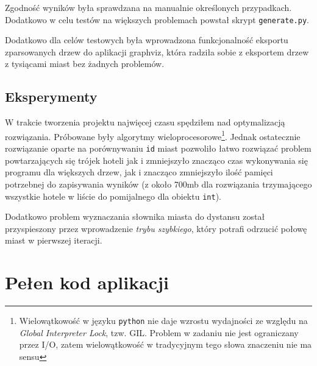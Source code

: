 \documentclass[12pt,a4paper]{article}
\begin{document}
    Zgodność wyników była sprawdzana na manualnie określonych przypadkach.
    Dodatkowo w celu testów na większych problemach powstał skrypt
    \texttt{generate.py}.

    Dodatkowo dla celów testowych była wprowadzona funkcjonalność eksportu
    zparsowanych drzew do aplikacji graphviz, która radziła sobie z eksportem
    drzew z tysiącami miast bez żadnych problemów.
	
	\subsection*{Eksperymenty}

    W trakcie tworzenia projektu najwięcej czasu spędziłem nad optymalizacją
    rozwiązania. Próbowane były algorytmy wieloprocesorowe\footnote{Wielowątkowość
    w języku \texttt{python} nie daje wzrostu wydajności ze względu na
    \emph{Global Interpreter Lock}, tzw. GIL. Problem w zadaniu nie jest
    ograniczany przez I/O, zatem wielowątkowość w tradycyjnym tego słowa
    znaczeniu nie ma sensu}. Jednak ostatecznie rozwiązanie
    oparte na porównywaniu \texttt{id} miast pozwoliło łatwo rozwiązać problem
    powtarzających się trójek hoteli jak i zmniejszyło znacząco czas
    wykonywania się programu dla większych drzew, jak i znacząco zmniejszyło
    ilość pamięci potrzebnej do zapisywania wyników (z około 700mb dla
    rozwiązania trzymającego wszystkie hotele w liście do pomijalnego dla
    obiektu \texttt{int}). 

    Dodatkowo problem wyznaczania słownika miasta do dystansu został
    przyspieszony przez wprowadzenie \emph{trybu szybkiego}, który potrafi
    odrzucić połowę miast w pierwszej iteracji.


    \newpage
	\section*{Pełen kod aplikacji}




\end{document}
